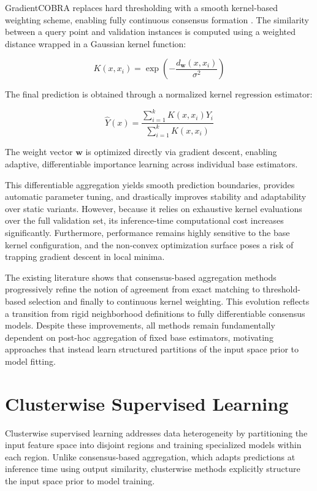 \hs GradientCOBRA replaces hard thresholding with a smooth kernel-based weighting scheme, enabling fully continuous consensus formation \cite{has2023gradientcobra}. The similarity between a query point and validation instances is computed using a weighted distance wrapped in a Gaussian kernel function:

\[    
    K(x, x_i) = \exp\left(-\frac{d_{\mathbf{w}}(x, x_i)}{\sigma^2}\right)
\]

The final prediction is obtained through a normalized kernel regression estimator:

\[    
    \hat{Y}(x) = \frac{\sum_{i=1}^{k} K(x, x_i) Y_i}{\sum_{i=1}^{k} K(x, x_i)}
\]

The weight vector $\mathbf{w}$ is optimized directly via gradient descent, enabling adaptive, differentiable importance learning across individual base estimators.

This differentiable aggregation yields smooth prediction boundaries, provides automatic parameter tuning, and drastically improves stability and adaptability over static variants. However, because it relies on exhaustive kernel evaluations over the full validation set, its inference-time computational cost increases significantly. Furthermore, performance remains highly sensitive to the base kernel configuration, and the non-convex optimization surface poses a risk of trapping gradient descent in local minima.

The existing literature shows that consensus-based aggregation methods progressively refine the notion of agreement from exact matching to threshold-based selection and finally to continuous kernel weighting. This evolution reflects a transition from rigid neighborhood definitions to fully differentiable consensus models. Despite these improvements, all methods remain fundamentally dependent on post-hoc aggregation of fixed base estimators, motivating approaches that instead learn structured partitions of the input space prior to model fitting.

\section{Clusterwise Supervised Learning}

\hs Clusterwise supervised learning addresses data heterogeneity by partitioning the input feature space into disjoint regions and training specialized models within each region. Unlike consensus-based aggregation, which adapts predictions at inference time using output similarity, clusterwise methods explicitly structure the input space prior to model training.

